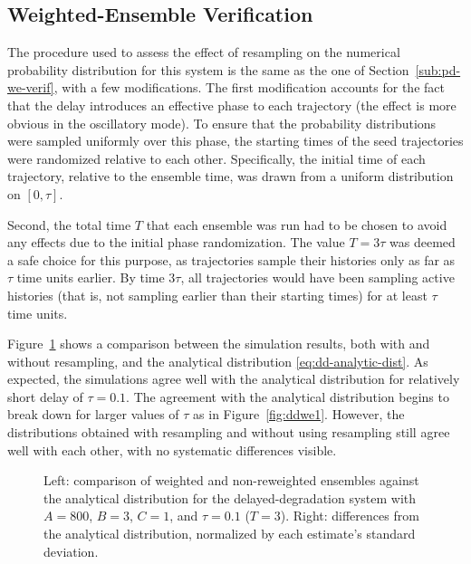 \documentclass[english,letterpaper,12pt]{report}
\begin{document}
\begin{doublespacing}
\subsection{Weighted-Ensemble Verification} %
\label{sub:dd-we-verif}

The procedure used to assess the effect of resampling on the numerical probability distribution for this system is the same as the one of Section~\ref{sub:pd-we-verif}, with a few modifications. The first modification accounts for the fact that the delay introduces an effective phase to each trajectory (the effect is more obvious in the oscillatory mode). To ensure that the probability distributions were sampled uniformly over this phase, the starting times of the seed trajectories were randomized relative to each other. Specifically, the initial time of each trajectory, relative to the ensemble time, was drawn from a uniform distribution on $[0, \tau]$.

Second, the total time $T$ that each ensemble was run had to be chosen to avoid any effects due to the initial phase randomization. The value $T = 3\tau$ was deemed a safe choice for this purpose, as trajectories sample their histories only as far as $\tau$ time units earlier. By time $3\tau$, all trajectories would have been sampling active histories (that is, not sampling earlier than their starting times) for at least $\tau$ time units.

Figure~\ref{fig:ddwe0} shows a comparison between the simulation results, both with and without resampling, and the analytical distribution \eqref{eq:dd-analytic-dist}. As expected, the simulations agree well with the analytical distribution for relatively short delay of $\tau = 0.1$. The agreement with the analytical distribution begins to break down for larger values of $\tau$ as in Figure~\ref{fig:ddwe1}. However, the distributions obtained with resampling and without using resampling still agree well with each other, with no systematic differences visible. 

\begin{figure}[t]
    \makebox[\linewidth][c]{
        \begin{subfigure}{3in}
            \begin{center}
                
            \end{center}
            \label{sfg:ddwe0-comp}
        \end{subfigure}
        \begin{subfigure}{3in}
            \begin{center}
                
            \end{center}
            \label{sfg:ddwe0-chi}
        \end{subfigure}
    }
    \caption{Left: comparison of weighted and non-reweighted ensembles against the analytical distribution for the delayed-degradation system with $A=800$, $B=3$, $C=1$, and $\tau=0.1$ ($T=3$). Right: differences from the analytical distribution, normalized by each estimate's standard deviation.}
    \label{fig:ddwe0}
\end{figure}


\end{doublespacing}
\end{document}

